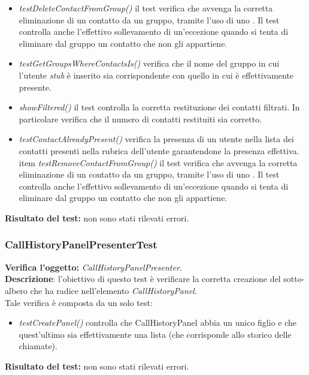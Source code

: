 \begin{itemize}
\item \textit{testDeleteContactFromGroup()} il test verifica che avvenga la corretta eliminazione di un contatto da un gruppo, tramite l'uso di uno . Il test controlla anche l'effettivo sollevamento di un'eccezione quando si tenta di eliminare dal gruppo un contatto che non gli appartiene.
\item \textit{testGetGroupsWhereContactsIs()} verifica che il nome del gruppo in cui l'utente \textit{stub} è inserito sia corrispondente con quello in cui è effettivamente presente.
\item \textit{showFiltered()} il test controlla la corretta restituzione dei contatti filtrati. In particolare verifica che il numero di contatti restituiti sia corretto.
\item \textit{testContactAlreadyPresent()} verifica la presenza di un utente nella lista dei contatti presenti nella rubrica dell'utente garantendone la presenza effettiva.
item \textit{testRemoveContactFromGroup()} il test verifica che avvenga la corretta eliminazione di un contatto da un gruppo, tramite l'uso di uno . Il test controlla anche l'effettivo sollevamento di un'eccezione quando si tenta di eliminare dal gruppo un contatto che non gli appartiene.
\end{itemize}
\textbf{Risultato del test:} non sono stati rilevati errori.

\subsubsection{CallHistoryPanelPresenterTest}
\textbf{Verifica l'oggetto:} \textit{CallHistoryPanelPresenter}.\\
\textbf{Descrizione}: l'obiettivo di questo test è verificare la corretta creazione del sotto-albero che ha radice nell'elemento \textit{CallHistoryPanel}.\\
Tale verifica è composta da un solo test:
\begin{itemize}
\item \textit{testCreatePanel() } controlla che CallHistoryPanel abbia un unico figlio e che quest'ultimo sia effettivamente una lista (che corrisponde allo storico delle chiamate).
\end{itemize}
\textbf{Risultato del test:} non sono stati rilevati errori.

